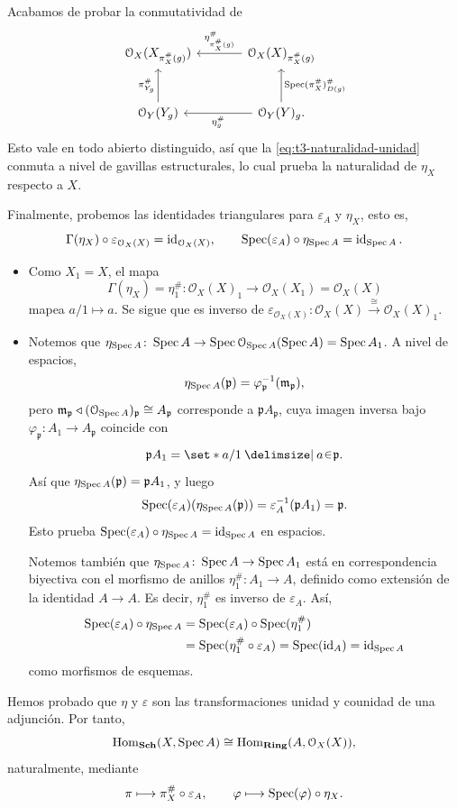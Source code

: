 \begin{sol}
Acabamos de probar la conmutatividad de
\[
\begin{tikzcd}[column sep=large,row sep=large]
\mathcal O_X(X_{\pi_X^\#(g)})
&\mathcal O_X(X)_{\pi_X^\#(g)}\arrow[l,"\eta^\#_{\pi_X^\#(g)}"']\\
\mathcal O_Y(Y_g)\arrow[u,"\pi^\#_{Y_g}"]
&\mathcal O_Y(Y)_g\arrow[l,"\eta_g^\#"]
\arrow[u,"{\Spec(\pi_X^\#)^\#_{D(g)}}"'].
\end{tikzcd}
\]
Esto vale en todo abierto distinguido, así que la \cref{eq:t3-naturalidad-unidad} conmuta a nivel de gavillas estructurales, lo cual prueba la naturalidad de $\eta_X$ respecto a $X$.

Finalmente, probemos las identidades triangulares para $\varepsilon_A$ y $\eta_X$, esto es,
\[
\Gamma(\eta_X)\circ\varepsilon_{\mathcal O_X(X)}=\operatorname{id}_{\mathcal O_X(X)},
\qquad
\operatorname{Spec}(\varepsilon_A)\circ\eta_{\operatorname{Spec} A}=\operatorname{id}_{\operatorname{Spec} A}.
\]
\begin{itemize}
\item Como $X_1=X$, el mapa
\[
\Gamma(\eta_X)=\eta_1^\#\colon\mathcal O_X(X)_1\longrightarrow\mathcal O_X(X_1)=\mathcal O_X(X)
\]
mapea $a/1\mapsto a$. Se sigue que es inverso de $\varepsilon_{\mathcal O_X(X)}\colon\mathcal O_X(X)\xrightarrow{\cong}\mathcal O_X(X)_1$.

\item Notemos que $\eta_{\operatorname{Spec} A}\colon\operatorname{Spec} A\to\operatorname{Spec}\mathcal O_{\operatorname{Spec} A}(\operatorname{Spec} A)=\operatorname{Spec} A_1$. A nivel de espacios,
\[
\eta_{\operatorname{Spec} A}(\mathfrak p)=\varphi_{\mathfrak p}^{-1}(\mathfrak m_{\mathfrak p}),
\]
pero $\mathfrak m_{\mathfrak p}\triangleleft(\mathcal O_{\operatorname{Spec} A})_{\mathfrak p}\cong A_{\mathfrak p}$ corresponde a $\mathfrak p A_{\mathfrak p}$, cuya imagen inversa bajo $\varphi_{\mathfrak p}\colon A_1\to A_{\mathfrak p}$ coincide con
\[
\mathfrak p A_1=\set*{a/1\given a\en\mathfrak p}.
\]
Así que $\eta_{\operatorname{Spec} A}(\mathfrak p)=\mathfrak p A_1$, y luego
\[
\operatorname{Spec}(\varepsilon_A)(\eta_{\operatorname{Spec} A}(\mathfrak p))
=\varepsilon_A^{-1}(\mathfrak p A_1)=\mathfrak p.
\]
Esto prueba $\operatorname{Spec}(\varepsilon_A)\circ\eta_{\operatorname{Spec} A}=\operatorname{id}_{\operatorname{Spec} A}$ en espacios.

Notemos también que $\eta_{\operatorname{Spec} A}\colon\operatorname{Spec} A\to\operatorname{Spec} A_1$ está en correspondencia biyectiva con el morfismo de anillos $\eta_1^\#\colon A_1\to A$, definido como extensión de la identidad $A\to A$. Es decir, $\eta_1^\#$ es inverso de $\varepsilon_A$. Así,
\[
\begin{aligned}
\operatorname{Spec}(\varepsilon_A)\circ\eta_{\operatorname{Spec} A}
&=\operatorname{Spec}(\varepsilon_A)\circ\operatorname{Spec}(\eta_1^\#)\\
&=\operatorname{Spec}(\eta_1^\#\circ\varepsilon_A)
=\operatorname{Spec}(\operatorname{id}_A)=\operatorname{id}_{\operatorname{Spec} A}
\end{aligned}
\]
como morfismos de esquemas.
\end{itemize}
Hemos probado que $\eta$ y $\varepsilon$ son las transformaciones unidad y counidad de una adjunción. Por tanto,
\[
\operatorname{Hom}_{\mathbf{Sch}}(X,\operatorname{Spec} A)\cong\operatorname{Hom}_{\mathbf{Ring}}(A,\mathcal O_X(X)),
\]
naturalmente, mediante
\[
\pi\longmapsto\pi_X^\#\circ\varepsilon_A,
\qquad
\varphi\longmapsto\operatorname{Spec}(\varphi)\circ\eta_X.
\]


\end{sol}
